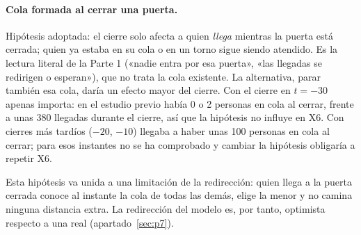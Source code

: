\paragraph{Cola formada al cerrar una puerta.}
Hipótesis adoptada: el cierre solo afecta a quien \emph{llega} mientras la puerta
está cerrada; quien ya estaba en su cola o en un torno sigue siendo atendido. Es
la lectura literal de la Parte 1 («nadie entra por esa puerta», «las llegadas se
redirigen o esperan»), que no trata la cola existente. La alternativa, parar
también esa cola, daría un efecto mayor del cierre. Con el cierre en $t=-30$
apenas importa: en el estudio previo había 0 o 2 personas en cola al cerrar,
frente a unas 380 llegadas durante el cierre, así que la hipótesis no influye
en X6. Con cierres más tardíos ($-20$, $-10$) llegaba a haber unas 100 personas
en cola al cerrar; para esos instantes no se ha comprobado y cambiar la
hipótesis obligaría a repetir X6.

Esta hipótesis va unida a una limitación de la redirección: quien llega a la
puerta cerrada conoce al instante la cola de todas las demás, elige la menor y no
camina ninguna distancia extra. La redirección del modelo es, por tanto,
optimista respecto a una real (apartado~\ref{sec:p7}).
